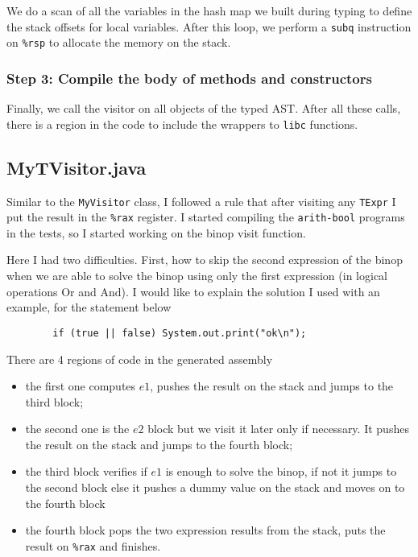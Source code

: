 \documentclass[a4paper,12pt,twoside]{article}
\begin{document}
	We do a scan of all the variables in the hash map we built during typing to define the stack offsets for local variables. After this loop, we perform a \texttt{subq} instruction on \texttt{\%rsp} to allocate the memory on the stack.
	
	\subsubsection{Step 3: Compile the body of methods and constructors}
	
	Finally, we call the visitor on all objects of the typed AST. After all these calls, there is a region in the code to include the wrappers to \texttt{libc} functions.
	
	\subsection{MyTVisitor.java}
	
	Similar to the \texttt{MyVisitor} class, I followed a rule that after visiting any \texttt{TExpr} I put the result in the \texttt{\%rax} register. I started compiling the \texttt{arith-bool} programs in the tests, so I started working on the binop visit function.
	
	Here I had two difficulties. First, how to skip the second expression of the binop when we are able to solve the binop using only the first expression (in logical operations Or and And). I would like to explain the solution I used with an example, for the statement below
	
	\begin{verbatim}
		if (true || false) System.out.print("ok\n");
	\end{verbatim}
	
	There are 4 regions of code in the generated assembly
	\begin{itemize}
		\item the first one computes $e1$, pushes the result on the stack and jumps to the third block;
		\item the second one is the $e2$ block but we visit it later only if necessary. It pushes the result on the stack and jumps to the fourth block;
		\item the third block verifies if $e1$ is enough to solve the binop, if not it jumps to the second block else it pushes a dummy value on the stack and moves on to the fourth block
		\item the fourth block pops the two expression results from the stack, puts the result on \texttt{\%rax} and finishes.
	\end{itemize}
	
\end{document}
